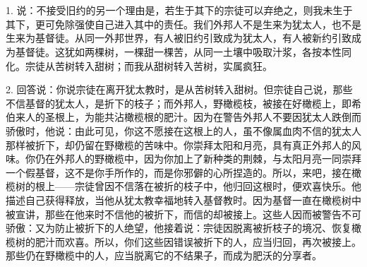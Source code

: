 
\section{}

\par

1. 说：不接受旧约的另一个理由是，若生于其下的宗徒可以弃绝之，则我未生于其下，更可免除强使自己进入其中的责任。我们外邦人不是生来为犹太人，也不是生来为基督徒。从同一外邦世界，有人被旧约引致成为犹太人，有人被新约引致成为基督徒。这犹如两棵树，一棵甜一棵苦，从同一土壤中吸取汁浆，各按本性同化。宗徒从苦树转入甜树；而我从甜树转入苦树，实属疯狂。\par

2. 回答说：你说宗徒在离开犹太教时，是从苦树转入甜树。但宗徒自己说，那些不信基督的犹太人，是折下的枝子；而外邦人，野橄榄枝，被接在好橄榄上，即希伯来人的圣根上，为能共沾橄榄根的肥汁。因为在警告外邦人不要因犹太人跌倒而骄傲时，他说：由此可见，你这不愿接在这根上的人，虽不像属血肉不信的犹太人那样被折下，却仍留在野橄榄的苦味中。你崇拜太阳和月亮，具有真正外邦人的风味。你仍在外邦人的野橄榄中，因为你加上了新种类的荆棘，与太阳月亮一同崇拜一个假基督，这不是你手所作的，而是你邪僻的心所捏造的。所以，来吧，接在橄榄树的根上——宗徒曾因不信落在被折的枝子中，他归回这根时，便欢喜快乐。他描述自己获得释放，当他从犹太教幸福地转入基督教时。因为基督一直在橄榄树中被宣讲，那些在他来时不信他的被折下，而信的却被接上。这些人因而被警告不可骄傲：又为防止被折下的人绝望，他接着说：宗徒因脱离被折枝子的境况、恢复橄榄树的肥汁而欢喜。所以，你们这些因错误被折下的人，应当归回，再次被接上。那些仍在野橄榄中的人，应当脱离它的不结果子，而成为肥沃的分享者。\par

